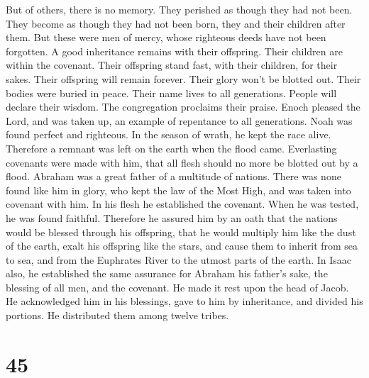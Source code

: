 But of others, there is no memory. They perished as
though they had not been. They become as though they had not been born,
they and their children after them.  But these were men
of mercy, whose righteous deeds have not been forgotten. 
A good inheritance remains with their offspring. Their children are
within the covenant.  Their offspring stand fast, with
their children, for their sakes.  Their offspring will
remain forever. Their glory won't be blotted out.  Their
bodies were buried in peace. Their name lives to all generations.
 People will declare their wisdom. The congregation
proclaims their praise.  Enoch pleased the Lord, and was
taken up, an example of repentance to all generations. 
Noah was found perfect and righteous. In the season of wrath, he kept
the race alive. Therefore a remnant was left on the earth when the flood
came.  Everlasting covenants were made with him, that all
flesh should no more be blotted out by a flood.  Abraham
was a great father of a multitude of nations. There was none found like
him in glory,  who kept the law of the Most High, and was
taken into covenant with him. In his flesh he established the covenant.
When he was tested, he was found faithful.  Therefore he
assured him by an oath that the nations would be blessed through his
offspring, that he would multiply him like the dust of the earth, exalt
his offspring like the stars, and cause them to inherit from sea to sea,
and from the Euphrates River to the utmost parts of the earth.
 In Isaac also, he established the same assurance for
Abraham his father's sake, the blessing of all men, and the covenant.
 He made it rest upon the head of Jacob. He acknowledged
him in his blessings, gave to him by inheritance, and divided his
portions. He distributed them among twelve tribes.

\hypertarget{section-32}{%
\section{45}\label{section-32}}

